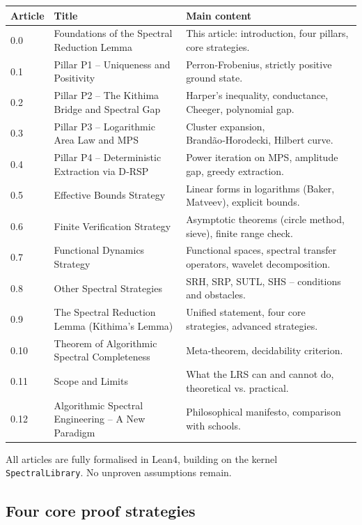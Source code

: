\documentclass[11pt,a4paper]{article}
\begin{document}
\begin{center}
\begin{tabular}{@{}llp{8cm}@{}}
\toprule
\textbf{Article} & \textbf{Title} & \textbf{Main content} \\
\midrule
0.0 & Foundations of the Spectral Reduction Lemma & This article: introduction, four pillars, core strategies. \\
0.1 & Pillar P1 – Uniqueness and Positivity & Perron‑Frobenius, strictly positive ground state. \\
0.2 & Pillar P2 – The Kithima Bridge and Spectral Gap & Harper’s inequality, conductance, Cheeger, polynomial gap. \\
0.3 & Pillar P3 – Logarithmic Area Law and MPS & Cluster expansion, Brandão‑Horodecki, Hilbert curve. \\
0.4 & Pillar P4 – Deterministic Extraction via D‑RSP & Power iteration on MPS, amplitude gap, greedy extraction. \\
0.5 & Effective Bounds Strategy & Linear forms in logarithms (Baker, Matveev), explicit bounds. \\
0.6 & Finite Verification Strategy & Asymptotic theorems (circle method, sieve), finite range check. \\
0.7 & Functional Dynamics Strategy & Functional spaces, spectral transfer operators, wavelet decomposition. \\
0.8 & Other Spectral Strategies & SRH, SRP, SUTL, SHS – conditions and obstacles. \\
0.9 & The Spectral Reduction Lemma (Kithima’s Lemma) & Unified statement, four core strategies, advanced strategies. \\
0.10 & Theorem of Algorithmic Spectral Completeness & Meta‑theorem, decidability criterion. \\
0.11 & Scope and Limits & What the LRS can and cannot do, theoretical vs. practical. \\
0.12 & Algorithmic Spectral Engineering – A New Paradigm & Philosophical manifesto, comparison with schools. \\
\bottomrule
\end{tabular}
\end{center}

All articles are fully formalised in Lean4, building on the kernel \texttt{SpectralLibrary}. No unproven assumptions remain.

\subsection{Four core proof strategies}
\end{document}
